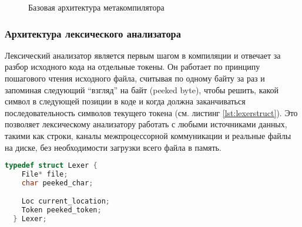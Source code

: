 \begin{figure}[th!]
  \centering
  \caption{Базовая архитектура метакомпилятора}
  \label{fig:architecture}
\end{figure}

\subsubsection{Архитектура лексического анализатора}

Лексический анализатор является первым шагом в компиляции и отвечает за разбор исходного кода на отдельные токены.
Он работает по принципу пошагового чтения исходного файла, считывая по одному байту за раз и запоминая следующий ``взгляд'' на байт (peeked byte), чтобы решить, какой символ в следующей позиции в коде и когда должна заканчиваться последовательность символов текущего токена (см. листинг \ref{lst:lexerstruct}).
Это позволяет лексическому анализатору работать с любыми источниками данных, такими как строки, каналы межпроцессорной коммуникации и реальные файлы на диске, без необходимости загрузки всего файла в память.

\begin{lstlisting}[language=c, caption={Упрощённая структура лексера}, label={lst:lexerstruct}]
  typedef struct Lexer {
    File* file;
    char peeked_char;

    Loc current_location;
    Token peeked_token;
  } Lexer;
\end{lstlisting}

